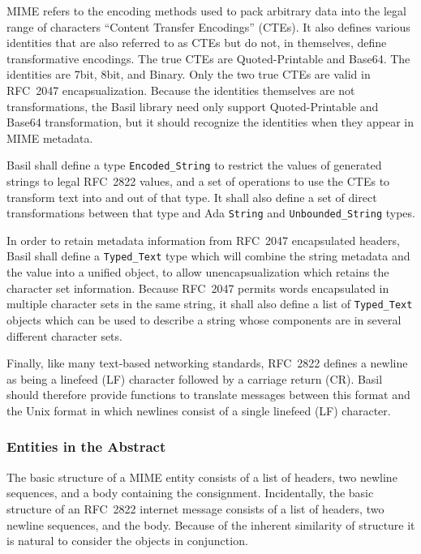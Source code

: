 \documentclass[11pt]{article}
\begin{document}
MIME refers to the encoding methods used to pack arbitrary data into
the legal range of characters ``Content Transfer Encodings'' (CTEs).
It also defines various identities that are also referred to as CTEs
but do not, in themselves, define transformative encodings. The true
CTEs are Quoted-Printable and Base64. The identities are 7bit, 8bit,
and Binary. Only the two true CTEs are valid in RFC~2047
encapsualization. Because the identities themselves are not
transformations, the Basil library need only support Quoted-Printable
and Base64 transformation, but it should recognize the identities when
they appear in MIME metadata.

Basil shall define a type \texttt{Encoded\_String} to restrict the
values of generated strings to legal RFC~2822 values, and a set of
operations to use the CTEs to transform text into and out of that
type. It shall also define a set of direct transformations between
that type and Ada \texttt{String} and \texttt{Unbounded\_String}
types.

In order to retain metadata information from RFC~2047 encapsulated
headers, Basil shall define a \texttt{Typed\_Text} type which will
combine the string metadata and the value into a unified object, to
allow unencapsualization which retains the character set
information. Because RFC~2047 permits words encapsulated in multiple
character sets in the same string, it shall also define a list of
\texttt{Typed\_Text} objects which can be used to describe a string
whose components are in several different character sets.

Finally, like many text-based networking standards, RFC~2822 defines a
newline as being a linefeed (LF) character followed by a carriage
return (CR). Basil should therefore provide functions to translate
messages between this format and the Unix format in which newlines
consist of a single linefeed (LF) character.

\subsubsection{Entities in the Abstract}
\label{pi:abstract-entities}

The basic structure of a MIME entity consists of a list of headers,
two newline sequences, and a body containing the consignment.
Incidentally, the basic structure of an RFC~2822 internet message
consists of a list of headers, two newline sequences, and the
body. Because of the inherent similarity of structure it is natural to
consider the objects in conjunction.
\end{document}
